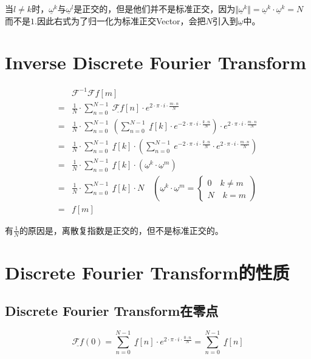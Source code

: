 当$l\neq k$时，$\underline{\omega}^k$与$\underline{\omega}^l$是正交的，但是他们并不是标准正交，因为$\Vert \underline{\omega}^k\Vert=\underline{\omega}^k\cdot \underline{\omega}^k=N$而不是$1$.因此右式为了归一化为标准正交Vector，会把$N$引入到$\underline{\omega}$中。
\section{Inverse Discrete Fourier Transform}
\begin{align*}
	  & \mathcal{F}^{-1}\mathcal{F}f[m]                                                                                                                                                              \\
	= & \frac{1}{N}\cdot \sum\limits_{n=0}^{N-1}\ \underline{\mathcal{F}f}[n]\cdot e^{2\cdot \pi\cdot i\cdot \frac{m\cdot n}{N}}                                                                     \\
	= & \frac{1}{N}\cdot \sum\limits_{n=0}^{N-1}\ (\sum\limits_{n=0}^{N-1}\ \underline{f}[k]\cdot e^{-2\cdot \pi\cdot i\cdot \frac{k\cdot n}{N}})\cdot e^{2\cdot \pi\cdot i\cdot \frac{m\cdot n}{N}} \\
	= & \frac{1}{N}\cdot \sum\limits_{n=0}^{N-1}\ \underline{f}[k]\cdot (\sum\limits_{n=0}^{N-1}\ e^{-2\cdot \pi\cdot i\cdot \frac{k\cdot n}{N}}\cdot e^{2\cdot \pi\cdot i\cdot \frac{m\cdot n}{N}}) \\
	= & \frac{1}{N}\cdot \sum\limits_{n=0}^{N-1}\ \underline{f}[k]\cdot(\underline{\omega}^k\cdot \underline{\omega}^m)                                                                              \\
	= & \frac{1}{N}\cdot \sum\limits_{n=0}^{N-1}\ \underline{f}[k]\cdot N\quad (\underline{\omega}^k\cdot \underline{\omega}^m=\begin{cases}
		0\quad k\neq m \\
		N\quad k=m
	\end{cases})                                           \\
	= & f[m]
\end{align*}

有$\frac{1}{N}$的原因是，离散复指数是正交的，但不是标准正交的。
\section{Discrete Fourier Transform的性质}
\subsection{Discrete Fourier Transform在零点}
$$
	\underline{\mathcal{F}f}(0)=\sum\limits_{n=0}^{N-1}\ \underline{f}[n]\cdot e^{2\cdot \pi\cdot i\cdot \frac{0\cdot n}{N}}=\sum\limits_{n=0}^{N-1}\ \underline{f}[n]
$$

